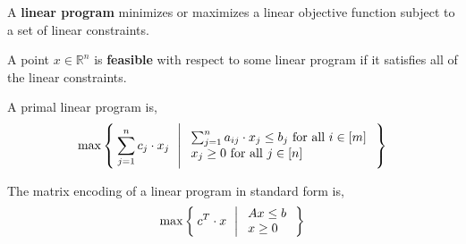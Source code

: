 	\begin{defn}
		A \textbf{linear program} minimizes or maximizes a linear objective function subject to a set of linear constraints.
	\end{defn}

	\begin{defn}[Feasibility]
		A point $x \in \mathbb{R}^n$ is \textbf{feasible} with respect to some linear program if it satisfies all of the linear constraints.
	\end{defn}

	\begin{defn}
		A primal linear program is,
		\[
		    \max \Set{ \sum_{j=1}^n c_j \cdot x_j \ | \begin{array}{l}
		    \sum_{j=1}^n a_{ij} \cdot x_j \leq b_j \text{ for all } i \in [m] \\
		    x_j \geq 0 \text{ for all } j \in [n]
		  \end{array}}
		\]	
	\end{defn}

	\begin{rmk}
		The matrix encoding of a linear program in standard form is,
		\[
		    \max \Set{ c^T \cdot x \ | \begin{array}{l}
		    Ax \leq b \\
		    x \geq 0
		  \end{array}}
		\]	
	\end{rmk}

